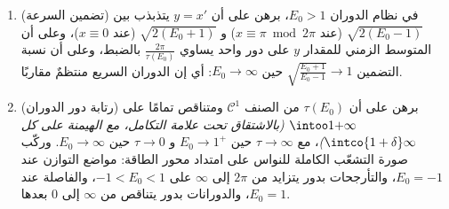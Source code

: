 \begin{problem}
\begin{enumerate}[resume]
  \item (تضمين السرعة) في نظام الدوران $E_0 > 1$، برهن على أن
        $y = x'$ يتذبذب بين $\sqrt{2(E_0 - 1)}$ (عند $x \equiv \pi \bmod 2\pi$) و $\sqrt{2(E_0 + 1)}$
        (عند $x \equiv 0$)، وعلى أن المتوسط الزمني للمقدار $y$
        على دور واحد يساوي $\frac{2\pi}{\tau(E_0)}$ بالضبط، وعلى أن نسبة
        التضمين $\sqrt{\frac{E_0 + 1}{E_0 - 1}} \to 1$ حين $E_0
        \to \infty$: أي إن الدوران السريع
        منتظمٌ مقاربًا.
  \item (رتابة دور الدوران) برهن على أن $\tau(E_0)$ من الصنف
        $\mathcal C^1$ ومتناقص تمامًا على $\intoo1{+\infty}$ \emph{(بالاشتقاق
        تحت علامة التكامل، مع الهيمنة على كل $\intco{1 + \delta}\infty$)}، مع
        $\tau \to \infty$ حين $E_0 \to 1^+$ و $\tau
        \to 0$ حين
        $E_0 \to \infty$. وركّب صورة التشعّب الكاملة للنواس على
        امتداد محور الطاقة: مواضع التوازن عند $E_0 = -1$،
        والتأرجحات بدور يتزايد من $2\pi$ إلى $\infty$ على
        $-1 < E_0 < 1$، والفاصلة عند $E_0 = 1$، والدورانات
        بدور يتناقص من $\infty$ إلى $0$ بعدها.
\end{enumerate}
\end{problem}

